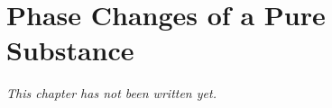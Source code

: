 \chapter{Phase Changes of a Pure Substance}\label{ch:b1:phase-changes}


\emph{This chapter has not been written yet.}
